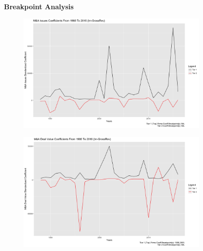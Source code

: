 \documentclass{article}
\begin{document}
\newpage
{\large \textbf{Breakpoint Analysis} }
\begin{figure}[H]\centering
\includegraphics[width=0.85\textwidth]{../IndivTexOutput/Breakpoints-1988-2016-lm-GrossRev-MnANumOfDeals-2.jpg}\end{figure}

\begin{figure}[H]\centering
\includegraphics[width=0.85\textwidth]{../IndivTexOutput/Breakpoints-1988-2016-lm-GrossRev-MnARevenue-2.jpg}\end{figure}

\newpage
\end{document}
